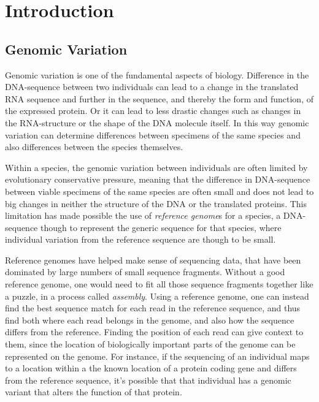 \chapter{Introduction}
\section{Genomic Variation}
Genomic variation is one of the fundamental aspects of biology. Difference in the DNA-sequence between two individuals can lead to a change in the translated RNA sequence and further in the sequence, and thereby the form and function, of the expressed protein. Or it can lead to less drastic changes such as changes in the RNA-structure or the shape of the DNA molecule itself. In this way genomic variation can determine differences between specimens of the same species and also differences between the species themselves.

Within a species, the genomic variation between individuals are often limited by evolutionary conservative pressure, 
meaning that the difference in DNA-sequence between viable specimens of the same species are often small and does not lead to big changes in neither the structure of the DNA or the translated proteins. This limitation has made  possible the use of \emph{reference genome}s for a species, a DNA-sequence though to represent the generic sequence for that species, where individual variation from the reference sequence are though to be small.

Reference genomes have helped make sense of sequencing data, that have been dominated by large numbers of small sequence fragments. Without a good reference genome, one would need to fit all those sequence fragments together like a puzzle, in a process called \emph{assembly}. Using a reference genome, one can instead find the best sequence match for each read in the reference sequence, and thus find both where each read belongs in the genome, and also how the sequence differs from the reference. Finding the position of each read can give context to them, since the location of biologically important parts of the genome can be represented on the genome. For instance, if the sequencing of an individual maps to a location within a the known location of a protein coding gene and differs from the reference sequence, it's possible that that individual has a genomic variant that alters the function of that protein. 

